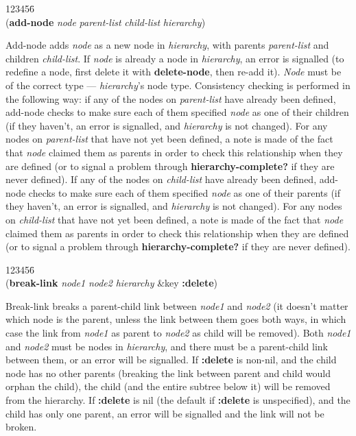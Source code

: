 \begin{tabbing}
123456\= \kill
\\
({\bf add-node} {\it node\/} {\it parent-list\/} {\it child-list\/} {\it hierarchy\/}) 
\end{tabbing}
Add-node adds {\it node} as a new node in {\it hierarchy}, with
parents {\it parent-list} and children {\it child-list}. If {\it node}
is already a node in {\it hierarchy}, an error is signalled (to
redefine a node, first delete it with {\bf delete-node}, then re-add
it). {\it Node} must be of the correct type --- {\it hierarchy\/}'s
node type. Consistency checking is performed in the following way: if
any of the nodes on {\it parent-list} have already been defined,
add-node checks to make sure each of them specified {\it node} as one
of their children (if they haven't, an error is signalled, and {\it
hierarchy} is not changed). For any nodes on {\it parent-list} that
have not yet been defined, a note is made of the fact that {\it node}
claimed them as parents in order to check this relationship when they
are defined (or to signal a problem through {\bf hierarchy-complete?}
if they are never defined). If any of the nodes on {\it child-list}
have already been defined, add-node checks to make sure each of them
specified {\it node} as one of their parents (if they haven't, an
error is signalled, and {\it hierarchy} is not changed). For any nodes
on {\it child-list} that have not yet been defined, a note is made of
the fact that {\it node} claimed them as parents in order to check
this relationship when they are defined (or to signal a problem
through {\bf hierarchy-complete?} if they are never defined).

\begin{tabbing}
123456\= \kill
\\
({\bf break-link} {\it node1\/} {\it node2\/} {\it hierarchy\/}
\&key {\bf :delete}) 
\end{tabbing}
Break-link breaks a parent-child link between {\it node1} and {\it
node2} (it doesn't matter which node is the parent, unless the link
between them goes both ways, in which case the link from {\it node1}
as parent to {\it node2} as child will be removed). Both {\it node1}
and {\it node2} must be nodes in {\it hierarchy}, and there must be a
parent-child link between them, or an error will be signalled. If {\bf
:delete} is non-nil, and the child node has no other parents (breaking
the link between parent and child would orphan the child), the child
(and the entire subtree below it) will be removed from the hierarchy.
If {\bf :delete} is nil (the default if {\bf :delete} is unspecified),
and the child has only one parent, an error will be signalled and the
link will not be broken.


